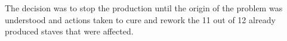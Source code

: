 The decision was to stop the production until the origin of the problem was understood and actions taken to cure and rework the 11 out of 12 already produced staves that were affected.


